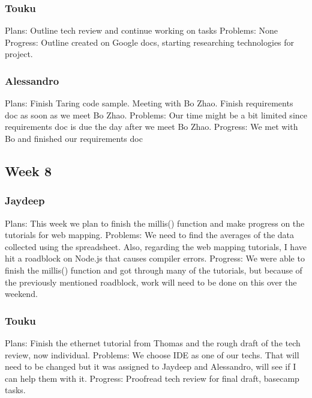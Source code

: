 \documentclass[onecolumn, draftclsnofoot,10pt, compsoc]{IEEEtran}
\begin{document}
\subsubsection{Touku}
Plans: Outline tech review and continue working on tasks
\newline
Problems: None
\newline
Progress: Outline created on Google docs, starting researching technologies for project.

\subsubsection{Alessandro}
Plans: Finish Taring code sample. Meeting with Bo Zhao. Finish requirements doc as soon as we meet Bo Zhao.
\newline
Problems: Our time might be a bit limited since requirements doc is due the day after we meet Bo Zhao.
\newline
Progress: We met with Bo and finished our requirements doc

\subsection{Week 8}
\subsubsection{Jaydeep}
Plans:  This week we plan to finish the millis() function and make progress on the tutorials for web mapping.
\newline
Problems:  We need to find the averages of the data collected using the spreadsheet. Also, regarding the web mapping tutorials, I have hit a roadblock on Node.js that causes compiler errors.
\newline
Progress:   We were able to finish the millis() function and got through many of the tutorials, but because of the previously mentioned roadblock, work will need to be done on this over the weekend.

\subsubsection{Touku}
Plans: Finish the ethernet tutorial from Thomas and the rough draft of the tech review, now individual.
\newline
Problems: We choose IDE as one of our techs.  That will need to be changed but it was assigned to Jaydeep and Alessandro, will see if I can help them with it.
\newline
Progress: Proofread tech review for final draft, basecamp tasks.
\end{document}
